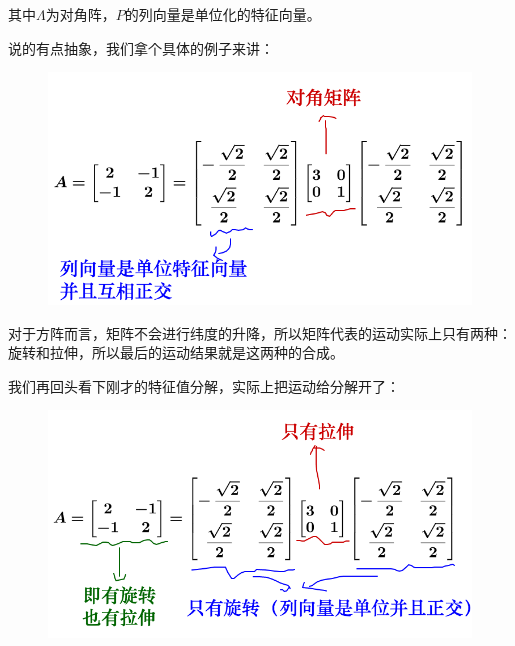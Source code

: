 \documentclass[12pt]{article}
\begin{document}
其中$\Lambda$为对角阵，$P$的列向量是单位化的特征向量。

说的有点抽象，我们拿个具体的例子来讲：
\begin{figure}[H]
    \centering
    \includegraphics[width=.5\textwidth]{fig/UnderstandEigenValueVector_9.png}
\end{figure} 

对于方阵而言，矩阵不会进行纬度的升降，所以矩阵代表的运动实际上只有两种：旋转和拉伸，所以最后的运动结果就是这两种的合成。

我们再回头看下刚才的特征值分解，实际上把运动给分解开了：
\begin{figure}[H]
    \centering
    \includegraphics[width=.5\textwidth]{fig/UnderstandEigenValueVector_10.png}
\end{figure} 



\end{document}
